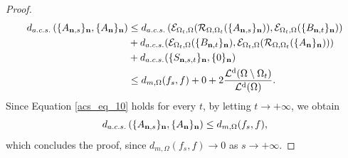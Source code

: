 \documentclass[10pt,a4paper]{amsart}
\DeclareMathOperator{\Ld}{\mathcal{L}^d}
\begin{document}
\begin{proof}
\begin{align}
       d_{a.c.s.}\left(\{A_{\bfn,s}\}_\bfn, \{A_\bfn\}_\bfn\right)&\leq d_{a.c.s.}\left(\mathcal{E}_{\Omega_t,\Omega}(\mathcal{R}_{\Omega,\Omega_t}(\{A_{\bfn,s}\}_\bfn)),\mathcal{E}_{\Omega_t,\Omega}(\{B_{\bfn,t}\}_\bfn)\right)\\
       \nonumber&+d_{a.c.s.}(\mathcal{E}_{\Omega_t,\Omega}(\{B_{\bfn,t}\}_\bfn),\mathcal{E}_{\Omega_t,\Omega}(\mathcal{R}_{\Omega,\Omega_t}(\{A_\bfn\}_\bfn)))\\
       \nonumber&+d_{a.c.s.}(\{S_{\bfn,s,t}\}_\bfn,\{0\}_\bfn)\\
       \nonumber&\leq d_{m,\Omega}(f_s,f)+ 0 + 2\frac{\Ld(\Omega\setminus\Omega_t)}{\Ld(\Omega)}.
   \end{align}
   Since Equation \eqref{acs_eq_10} holds for every $t$, by letting $t\to+\infty$, we obtain
   \begin{equation*}
       d_{a.c.s.}\left(\{A_{\mathbf n,s}\}_\mathbf n, \{A_\mathbf n\}_\mathbf n\right)\leq d_{m,\Omega}(f_s,f),
   \end{equation*}
   which concludes the proof, since $d_{m,\Omega}(f_s,f)\to 0$ as $s\to+\infty$.
   \end{proof}
\end{document}
